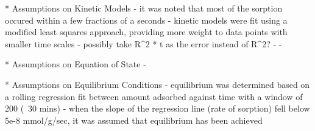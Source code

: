   
* Assumptions on Kinetic Models
- it was noted that most of the sorption occured within a few fractions of a seconds
- kinetic models were fit using a modified least squares approach, providing more weight to data points with smaller time scales
  - possibly take R^2 * t as the error instead of R^2?
- 
- 

* Assumptions on Equation of State
- 

* Assumptions on Equilibrium Conditions
- equilibrium was determined based on a rolling regression fit between amount adsorbed against time with a window of 200 (~30 mins)
- when the slope of the regression line (rate of sorption) fell below 5e-8 mmol/g/sec, it was assumed that equilibrium has been achieved


